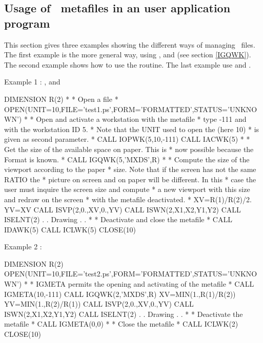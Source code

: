 \subsection{Usage of \PS~metafiles in an user application program}
This section gives three examples showing the different ways of managing
\PS~files. The first example is the more general way, using
,  and  (see section \ref{IGQWK}). The
second example shows how to use the  routine. The last example
use  and .
\begin{XMPt}{Example 1 : ,  and }

      DIMENSION R(2)
*
*              Open a \FORTRAN file
*
      OPEN(UNIT=10,FILE='test1.ps',FORM='FORMATTED',STATUS='UNKNOWN')
*
*              Open and activate a workstation with the \PS metafile
*              type -111 and with the workstation ID 5.
*              Note that the UNIT used to open the \FORTRAN (here 10)
*              is given as second parameter.
*
      CALL IOPWK(5,10,-111)
      CALL IACWK(5)
*
*              Get the size of the available space on paper. This is
*              now possible because the Format is known.
*
      CALL IGQWK(5,'MXDS',R)
*
*              Compute the size of the viewport according to the paper
*              size. Note that if the screen has not the same RATIO the
*              picture on screen and on paper will be different. In this
*              case the user must inquire the screen size and compute
*              a new viewport with this size and redraw on the screen
*              with the metafile deactivated.
*
      XV=R(1)/R(2)/2.
      YV=XV
      CALL ISVP(2,0.,XV,0.,YV)
      CALL ISWN(2,X1,X2,Y1,Y2)
      CALL ISELNT(2)
          .
          .
        Drawing
          .
          .
*
*              Deactivate and close the metafile
*
      CALL IDAWK(5)
      CALL ICLWK(5)
      CLOSE(10)

\end{XMPt}
\begin{XMPt}{Example 2 : }

      DIMENSION R(2)
      OPEN(UNIT=10,FILE='test2.ps',FORM='FORMATTED',STATUS='UNKNOWN')
*
*              IGMETA permits the opening and activating of the metafile
*
      CALL IGMETA(10,-111)
      CALL IGQWK(2,'MXDS',R)
      XV=MIN(1.,R(1)/R(2))
      YV=MIN(1.,R(2)/R(1))
      CALL ISVP(2,0.,XV,0.,YV)
      CALL ISWN(2,X1,X2,Y1,Y2)
      CALL ISELNT(2)
          .
          .
        Drawing
          .
          .
*
*              Deactivate the metafile
*
      CALL IGMETA(0,0)
*
*              Close the metafile
*
      CALL ICLWK(2)
      CLOSE(10)

\end{XMPt}

